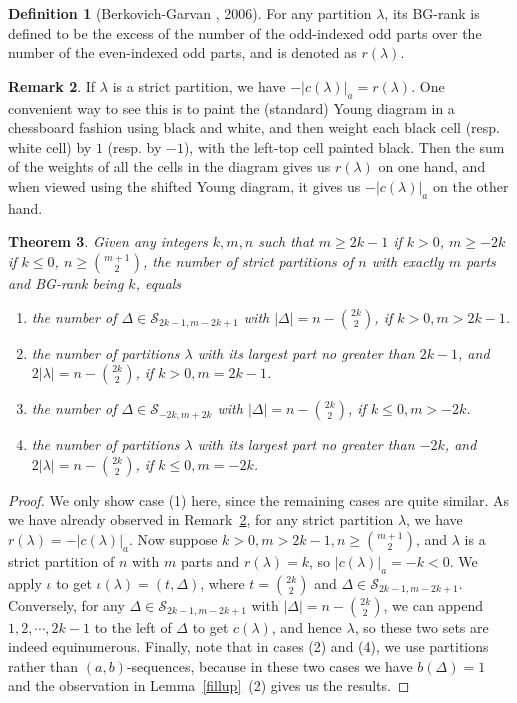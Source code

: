 \documentclass[12pt,reqno]{amsart}
\numberwithin{equation}{section}
\theoremstyle{plain}
\newtheorem{theorem}{Theorem}[section]
\theoremstyle{definition}
\newtheorem{Def}[theorem]{Definition}
\newtheorem{remark}[theorem]{Remark}
\newcommand{\s}{\mathcal{S}}
\begin{document}
\begin{Def}[Berkovich-Garvan \cite{BG}, 2006]
For any partition $\lambda$, its BG-rank is defined to be the excess of the number of the odd-indexed odd parts over the number of the even-indexed odd parts, and is denoted as $r(\lambda)$.
\end{Def}
\begin{remark}\label{twodef}
If $\lambda$ is a strict partition, we have $-|c(\lambda)|_a=r(\lambda)$. One convenient way to see this is to paint the (standard) Young diagram in a chessboard fashion using black and white, and then weight each black cell (resp. white cell) by $1$ (resp. by $-1$), with the left-top cell painted black. Then the sum of the weights of all the cells in the diagram gives us $r(\lambda)$ on one hand, and when viewed using the shifted Young diagram, it gives us $-|c(\lambda)|_a$ on the other hand.
\end{remark}
\begin{theorem}\label{4case}
Given any integers $k,m,n$ such that $m\ge 2k-1$ if $k>0$, $m\ge -2k$ if $k\le 0$, $n\ge \binom{m+1}{2}$, the number of strict partitions of $n$ with exactly $m$ parts and BG-rank being $k$, equals
\begin{enumerate}
\item the number of $\Delta \in \s_{2k-1,m-2k+1}$ with $|\Delta|=n-\binom{2k}{2}$, if $k>0, m>2k-1$.
\item the number of partitions $\lambda$ with its largest part no greater than $2k-1$, and $2|\lambda|=n-\binom{2k}{2}$, if $k>0, m=2k-1$.
\item the number of $\Delta \in \s_{-2k,m+2k}$ with $|\Delta|=n-\binom{2k}{2}$, if $k\le 0, m>-2k$.
\item the number of partitions $\lambda$ with its largest part no greater than $-2k$, and $2|\lambda|=n-\binom{2k}{2}$, if $k\le 0, m=-2k$.
\end{enumerate}
\end{theorem}
\begin{proof}
We only show case (1) here, since the remaining cases are quite similar. As we have already observed in Remark~\ref{twodef}, for any strict partition $\lambda$, we have $r(\lambda)=-|c(\lambda)|_a$. Now suppose $k>0, m>2k-1, n\ge \binom{m+1}{2}$, and $\lambda$ is a strict partition of $n$ with $m$ parts and $r(\lambda)=k$, so $|c(\lambda)|_a=-k<0$. We apply $\iota$ to get $\iota(\lambda)=(t,\Delta)$, where $t=\binom{2k}{2}$ and $\Delta\in\s_{2k-1,m-2k+1}$. Conversely, for any $\Delta\in\s_{2k-1,m-2k+1}$ with $|\Delta|=n-\binom{2k}{2}$, we can append $1,2,\cdots,2k-1$ to the left of $\Delta$ to get $c(\lambda)$, and hence $\lambda$, so these two sets are indeed equinumerous. Finally, note that in cases (2) and (4), we use partitions rather than $(a,b)$-sequences, because in these two cases we have $b(\Delta)=1$ and the observation in Lemma~\ref{fillup}~(2) gives us the results.
\end{proof}
\end{document}
